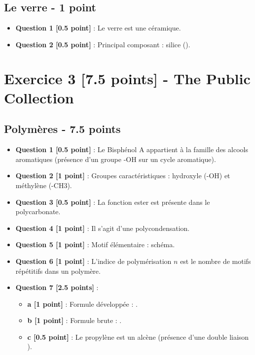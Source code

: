 \documentclass[a4paper,12pt]{article}
\begin{document}
\subsection*{Le verre - 1 point}
\begin{itemize}
    \item \textbf{Question 1 [0.5 point]} : Le verre est une céramique.
    \item \textbf{Question 2 [0.5 point]} : Principal composant : silice ().
\end{itemize}

\section*{Exercice 3 [7.5 points] - The Public Collection}

\subsection*{Polymères - 7.5 points}
\begin{itemize}
    \item \textbf{Question 1 [0.5 point]} : Le Bisphénol A appartient à la famille des alcools aromatiques (présence d’un groupe -OH sur un cycle aromatique).
    \item \textbf{Question 2 [1 point]} : Groupes caractéristiques : hydroxyle (-OH) et méthylène (-CH3).
    \item \textbf{Question 3 [0.5 point]} : La fonction ester est présente dans le polycarbonate.
    \item \textbf{Question 4 [1 point]} : Il s'agit d'une polycondensation.
    \item \textbf{Question 5 [1 point]} : Motif élémentaire : schéma.
    \item \textbf{Question 6 [1 point]} : L'indice de polymérisation $n$ est le nombre de motifs répétitifs dans un polymère.
    \item \textbf{Question 7 [2.5 points]} :
    \begin{itemize}
        \item \textbf{a [1 point]} : Formule développée : .
        \item \textbf{b [1 point]} : Formule brute : .
        \item \textbf{c [0.5 point]} : Le propylène est un alcène (présence d'une double liaison ).
    \end{itemize}
\end{itemize}
\end{document}
